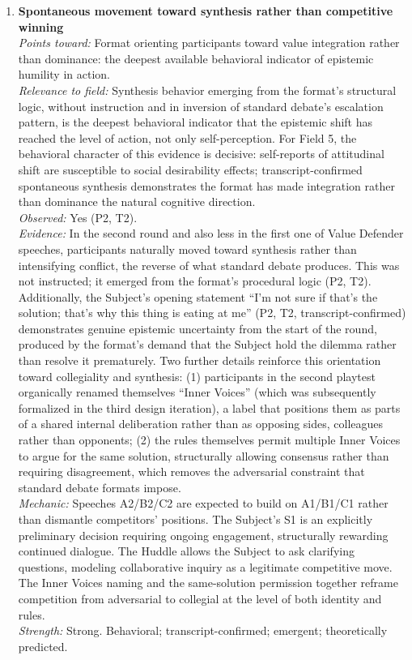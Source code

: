 \begin{enumerate}
\item \textbf{Spontaneous movement toward synthesis rather than competitive winning}\\
\textit{Points toward:} Format orienting participants toward value integration rather than dominance: the deepest available behavioral indicator of epistemic humility in action.\\
\textit{Relevance to field:} Synthesis behavior emerging from the format's structural logic, without instruction and in inversion of standard debate's escalation pattern, is the deepest behavioral indicator that the epistemic shift has reached the level of action, not only self-perception. For Field 5, the behavioral character of this evidence is decisive: self-reports of attitudinal shift are susceptible to social desirability effects; transcript-confirmed spontaneous synthesis demonstrates the format has made integration rather than dominance the natural cognitive direction.\\
\textit{Observed:} Yes (P2, T2).\\
\textit{Evidence:} In the second round and also less in the first one of Value Defender speeches, participants naturally moved toward synthesis rather than intensifying conflict, the reverse of what standard debate produces. This was not instructed; it emerged from the format's procedural logic (P2, T2). Additionally, the Subject's opening statement ``I'm not sure if that's the solution; that's why this thing is eating at me'' (P2, T2, transcript-confirmed) demonstrates genuine epistemic uncertainty from the start of the round, produced by the format's demand that the Subject hold the dilemma rather than resolve it prematurely. Two further details reinforce this orientation toward collegiality and synthesis: (1) participants in the second playtest organically renamed themselves ``Inner Voices'' (which was subsequently formalized in the third design iteration), a label that positions them as parts of a shared internal deliberation rather than as opposing sides, colleagues rather than opponents; (2) the rules themselves permit multiple Inner Voices to argue for the same solution, structurally allowing consensus rather than requiring disagreement, which removes the adversarial constraint that standard debate formats impose.\\
\textit{Mechanic:} Speeches A2/B2/C2 are expected to build on A1/B1/C1 rather than dismantle competitors' positions. The Subject's S1 is an explicitly preliminary decision requiring ongoing engagement, structurally rewarding continued dialogue. The Huddle allows the Subject to ask clarifying questions, modeling collaborative inquiry as a legitimate competitive move. The Inner Voices naming and the same-solution permission together reframe competition from adversarial to collegial at the level of both identity and rules.\\
\textit{Strength:} Strong. Behavioral; transcript-confirmed; emergent; theoretically predicted.

\end{enumerate}

